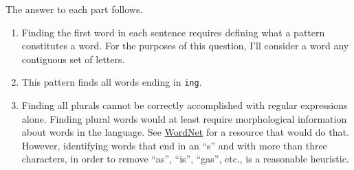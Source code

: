 \documentclass[]{book}
\newenvironment{Shaded}{\begin{snugshade}}{\end{snugshade}}
\newcommand{\CharTok}[1]{\textcolor[rgb]{0.31,0.60,0.02}{#1}}
\newcommand{\CommentTok}[1]{\textcolor[rgb]{0.56,0.35,0.01}{\textit{#1}}}
\newcommand{\KeywordTok}[1]{\textcolor[rgb]{0.13,0.29,0.53}{\textbf{#1}}}
\newcommand{\NormalTok}[1]{#1}
\newcommand{\OperatorTok}[1]{\textcolor[rgb]{0.81,0.36,0.00}{\textbf{#1}}}
\newcommand{\StringTok}[1]{\textcolor[rgb]{0.31,0.60,0.02}{#1}}
\theoremstyle{plain}
\theoremstyle{remark}
\theoremstyle{definition}
\theoremstyle{definition}
\theoremstyle{definition}
\theoremstyle{remark}
\begin{document}
The answer to each part follows.

\begin{enumerate}
\def\labelenumi{\arabic{enumi}.}
\item
  Finding the first word in each sentence requires defining what a
  pattern constitutes a word. For the purposes of this question, I'll
  consider a word any contiguous set of letters.

\begin{Shaded}
\end{Shaded}
\item
  This pattern finds all words ending in \texttt{ing}.

\begin{Shaded}
\end{Shaded}
\item
  Finding all plurals cannot be correctly accomplished with regular
  expressions alone. Finding plural words would at least require
  morphological information about words in the language. See
  \href{https://cran.r-project.org/web/packages/wordnet/index.html}{WordNet}
  for a resource that would do that. However, identifying words that end
  in an ``s'' and with more than three characters, in order to remove
  ``as'', ``is'', ``gas'', etc., is a reasonable heuristic.

\begin{Shaded}
\end{Shaded}
\end{enumerate}
\end{document}
